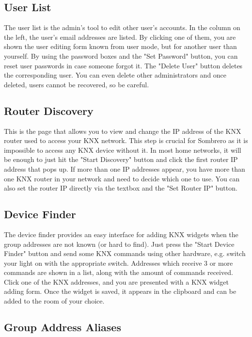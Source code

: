 \subsection{User List}

  The user list is the admin's tool to edit other user's accounts. In the column on the left, the user's email addresses are listed. By clicking one of them, you are shown the user editing form known from user mode, but for another user than yourself. By using the password boxes and the "Set Password" button, you can reset user passwords in case someone forgot it. The "Delete User" button deletes the corresponding user. You can even delete other administrators and once deleted, users cannot be recovered, so be careful.

\subsection{Router Discovery}

  This is the page that allows you to view and change the IP address of the KNX router used to access your KNX network. This step is crucial for Sombrero as it is impossible to access any KNX device without it. In most home networks, it will be enough to just hit the "Start Discovery" button and click the first router IP address that pops up. If more than one IP addresses appear, you have more than one KNX router in your network and need to decide which one to use. You can also set the router IP directly via the textbox and the "Set Router IP" button.

\subsection{Device Finder}

  The device finder provides an easy interface for adding KNX widgets when the group addresses are not known (or hard to find). Just press the "Start Device Finder" button and send some KNX commands using other hardware, e.g. switch your light on with the appropriate switch. Addresses which receive 3 or more commands are shown in a list, along with the amount of commands received. Click one of the KNX addresses, and you are presented with a KNX widget adding form. Once the widget is saved, it appears in the clipboard and can be added to the room of your choice.

\subsection{Group Address Aliases}

